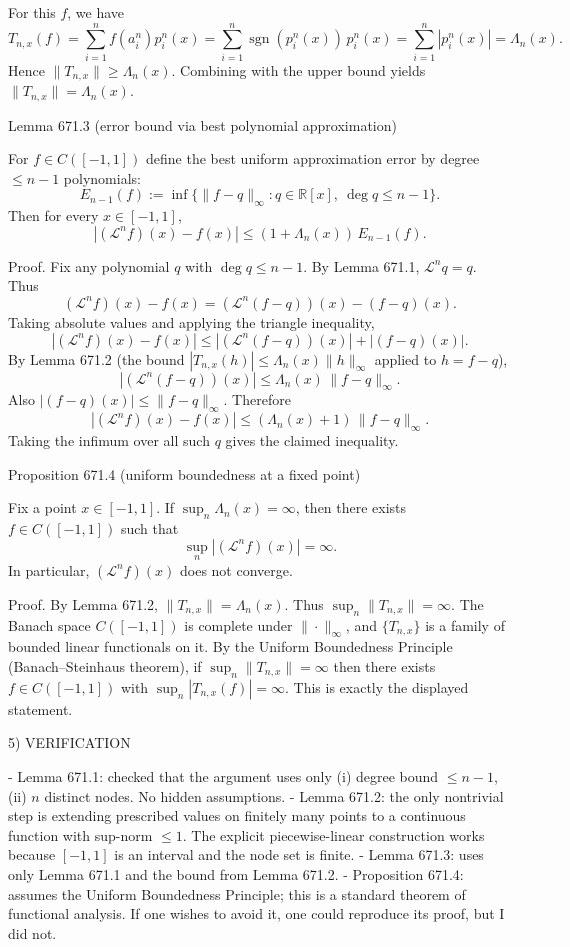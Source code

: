 For this $f$, we have
\[
T_{n,x}(f)=\sum_{i=1}^n f(a_i^n)p_i^n(x)=\sum_{i=1}^n \operatorname{sgn}(p_i^n(x))\,p_i^n(x)=\sum_{i=1}^n |p_i^n(x)|=\Lambda_n(x).
\]
Hence $\|T_{n,x}\|\ge \Lambda_n(x)$. Combining with the upper bound yields $\|T_{n,x}\|=\Lambda_n(x)$.


Lemma 671.3 (error bound via best polynomial approximation)

For $f\in C([-1,1])$ define the best uniform approximation error by degree $\le n-1$ polynomials:
\[
E_{n-1}(f):=\inf\{\|f-q\|_\infty: q\in\mathbb R[x],\ \deg q\le n-1\}.
\]
Then for every $x\in[-1,1]$,
\[
 |(\mathcal L^n f)(x)-f(x)|\le (1+\Lambda_n(x))\,E_{n-1}(f).
\]

Proof.
Fix any polynomial $q$ with $\deg q\le n-1$. By Lemma 671.1, $\mathcal L^n q=q$. Thus
\[
(\mathcal L^n f)(x)-f(x)=(\mathcal L^n (f-q))(x)-(f-q)(x).
\]
Taking absolute values and applying the triangle inequality,
\[
 |(\mathcal L^n f)(x)-f(x)|\le |(\mathcal L^n (f-q))(x)|+|(f-q)(x)|.
\]
By Lemma 671.2 (the bound $|T_{n,x}(h)|\le\Lambda_n(x)\|h\|_\infty$ applied to $h=f-q$),
\[
 |(\mathcal L^n (f-q))(x)|\le\Lambda_n(x)\,\|f-q\|_\infty.
\]
Also $|(f-q)(x)|\le\|f-q\|_\infty$. Therefore
\[
 |(\mathcal L^n f)(x)-f(x)|\le (\Lambda_n(x)+1)\,\|f-q\|_\infty.
\]
Taking the infimum over all such $q$ gives the claimed inequality.


Proposition 671.4 (uniform boundedness at a fixed point)

Fix a point $x\in[-1,1]$. If $\sup_n \Lambda_n(x)=\infty$, then there exists $f\in C([-1,1])$ such that
\[
 \sup_n |(\mathcal L^n f)(x)|=\infty.
\]
In particular, $(\mathcal L^n f)(x)$ does not converge.

Proof.
By Lemma 671.2, $\|T_{n,x}\|=\Lambda_n(x)$. Thus $\sup_n\|T_{n,x}\|=\infty$. The Banach space $C([-1,1])$ is complete under $\|\cdot\|_\infty$, and $\{T_{n,x}\}$ is a family of bounded linear functionals on it. By the Uniform Boundedness Principle (Banach--Steinhaus theorem), if $\sup_n\|T_{n,x}\|=\infty$ then there exists $f\in C([-1,1])$ with $\sup_n |T_{n,x}(f)|=\infty$. This is exactly the displayed statement.


5) VERIFICATION

- Lemma 671.1: checked that the argument uses only (i) degree bound $\le n-1$, (ii) $n$ distinct nodes. No hidden assumptions.
- Lemma 671.2: the only nontrivial step is extending prescribed values on finitely many points to a continuous function with sup-norm $\le 1$. The explicit piecewise-linear construction works because $[-1,1]$ is an interval and the node set is finite.
- Lemma 671.3: uses only Lemma 671.1 and the bound from Lemma 671.2.
- Proposition 671.4: assumes the Uniform Boundedness Principle; this is a standard theorem of functional analysis. If one wishes to avoid it, one could reproduce its proof, but I did not.

